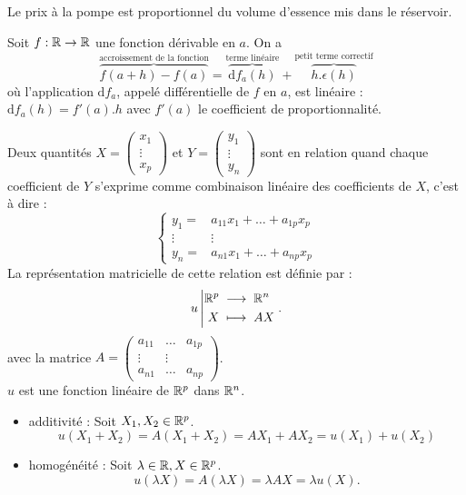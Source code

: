 \documentclass{book}
\begin{document}
\begin{Exemple}[Essence]
Le prix à la pompe est proportionnel du volume d'essence mis dans le réservoir.
\end{Exemple}
\begin{Exemple}[Différentielle]
Soit $f:\mathbb{R} \rightarrow \mathbb{R} $ une fonction dérivable en $a$. On a  
$$\overbrace{f(a+h)-f(a)}^{\text{accroissement de la fonction}}=\overbrace{\mathrm {d}f_a(h)}^{\text{terme linéaire}}+\overbrace{h.\epsilon(h)}^{\text{petit terme correctif}}$$ où l'application $\mathrm {d}f_a$, appelé différentielle de $f$ en $a$, est linéaire : $\mathrm {d}f_a(h)=f'(a).h$ avec $f'(a)$ le coefficient de proportionnalité.
\end{Exemple}

\begin{DefinitionProposition}
Deux quantités $X=\begin{pmatrix}
x_1\\\vdots\\x_p
\end{pmatrix}$ et $Y=\begin{pmatrix}
y_1\\\vdots\\y_n
\end{pmatrix}$ sont en relation  quand chaque coefficient de $Y$ s'exprime comme combinaison linéaire des coefficients de $X$, c'est à dire :
$$
\begin{cases}
y_1=&a_{11}x_1+\dots+a_{1p}x_p\\
\vdots&\vdots\\
y_n=&a_{n1}x_1+\dots+a_{np}x_p
\end{cases}
$$
La représentation matricielle de cette relation est définie par :$${u}\left|\begin{aligned}{\mathbb{R}^p}&\;\longrightarrow\;{\mathbb{R}^n}\\{X}&\;\longmapsto\;{AX}\end{aligned}\right..$$ avec la matrice $A=\begin{pmatrix}
a_{11}&\dots&a_{1p}\\\vdots&\vdots\\a_{n1}&\dots&a_{np}
\end{pmatrix}$.\\
  $u$ est une fonction linéaire de $\mathbb{R}^p$ dans $\mathbb{R}^n$.
\end{DefinitionProposition}
\begin{Demonstration}
\begin{itemize}
\item additivité : Soit $X_1,X_2\in \mathbb{R}^p$.\\
$$u(  X_1+X_2)=A(  X_1+X_2)=AX_1+AX_2=u(X_1)+u(X_2)$$
\item homogénéité : Soit $\lambda\in\mathbb{R}, X\in \mathbb{R}^p$.\\
$$u(\lambda  X)=A( \lambda X)=\lambda A X=\lambda u(X).$$
\end{itemize} 
\end{Demonstration}
\end{document}

